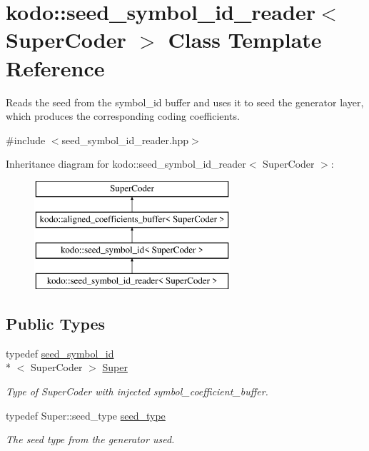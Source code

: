 \hypertarget{classkodo_1_1seed__symbol__id__reader}{\section{kodo\-:\-:seed\-\_\-symbol\-\_\-id\-\_\-reader$<$ Super\-Coder $>$ Class Template Reference}
\label{classkodo_1_1seed__symbol__id__reader}
}


Reads the seed from the symbol\-\_\-id buffer and uses it to seed the generator layer, which produces the corresponding coding coefficients.  




{\ttfamily \#include $<$seed\-\_\-symbol\-\_\-id\-\_\-reader.\-hpp$>$}

Inheritance diagram for kodo\-:\-:seed\-\_\-symbol\-\_\-id\-\_\-reader$<$ Super\-Coder $>$\-:\begin{figure}[H]
\begin{center}
\leavevmode
\includegraphics[height=4.000000cm]{classkodo_1_1seed__symbol__id__reader}
\end{center}
\end{figure}
\subsection*{Public Types}
\begin{DoxyCompactItemize}
\item 
\hypertarget{classkodo_1_1seed__symbol__id__reader_adad0f4c0101e897312b3d5d80d6ab305}{typedef \hyperlink{classkodo_1_1seed__symbol__id}{seed\-\_\-symbol\-\_\-id}\\*
$<$ Super\-Coder $>$ \hyperlink{classkodo_1_1seed__symbol__id__reader_adad0f4c0101e897312b3d5d80d6ab305}{Super}}\label{classkodo_1_1seed__symbol__id__reader_adad0f4c0101e897312b3d5d80d6ab305}

\begin{DoxyCompactList}\small\item\em Type of Super\-Coder with injected symbol\-\_\-coefficient\-\_\-buffer. \end{DoxyCompactList}\item 
\hypertarget{classkodo_1_1seed__symbol__id__reader_a92b4b45358efa9e119d9e326c4bf390a}{typedef Super\-::seed\-\_\-type \hyperlink{classkodo_1_1seed__symbol__id__reader_a92b4b45358efa9e119d9e326c4bf390a}{seed\-\_\-type}}\label{classkodo_1_1seed__symbol__id__reader_a92b4b45358efa9e119d9e326c4bf390a}

\begin{DoxyCompactList}\small\item\em The seed type from the generator used. \end{DoxyCompactList}\end{DoxyCompactItemize}
